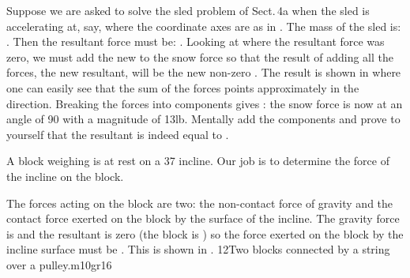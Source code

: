 {
Suppose we are asked to solve the sled problem of Sect.\,4a when the
sled is accelerating at, say,  where
the coordinate axes are as in .
The mass of the sled is: . Then the resultant force must be:
.
Looking at  where the resultant force was zero, we must add
the new  to the snow force so that the result of adding
all the forces, the new resultant, will be the new non-zero .
The result is shown in  where one can easily see that the sum
of the forces points approximately in the  direction.
Breaking the forces into components gives : the snow
force is now at an angle of {90\degrees} with a magnitude of
13\unit{lb}.
Mentally add the components and prove to yourself that the resultant is
indeed equal to .

A block weighing  is at rest on a {37\degrees} incline.
Our job is to determine the force of the incline on the block.

The forces acting on the block are two: the non-contact force of gravity
and the contact force exerted on the block by the surface of the incline.
The gravity force is  and the
resultant is zero (the block is ) so the force exerted on the
block by the incline surface must be .
This is shown in .
%
 {12}{Two blocks connected by a string over a pulley.}{m10gr16}
%
}%
%
